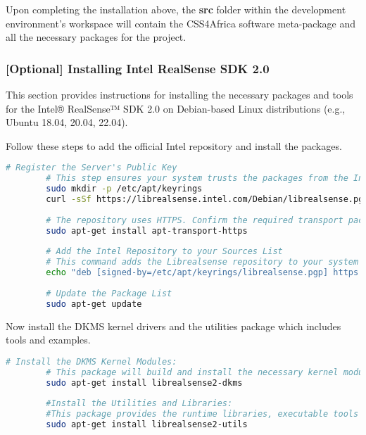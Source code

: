 \documentclass{CSSRforAfrica}
\begin{document}
{		\noindent Upon completing the installation above, the \textbf{src} folder within the development environment's workspace will contain the CSS4Africa software meta-package and all the necessary packages for the project. 
		
		\subsubsection{[Optional] Installing Intel RealSense SDK 2.0}
		This section provides instructions for installing the necessary packages and tools for the Intel® RealSense™ SDK 2.0 on Debian-based Linux distributions (e.g., Ubuntu 18.04, 20.04, 22.04).
		
		Follow these steps to add the official Intel repository and install the packages.
		
		\begin{lstlisting}[style=withoutNumbering, language=bash]
		# Register the Server's Public Key
		# This step ensures your system trusts the packages from the Intel repository.
		sudo mkdir -p /etc/apt/keyrings
		curl -sSf https://librealsense.intel.com/Debian/librealsense.pgp | sudo tee /etc/apt/keyrings/librealsense.pgp > /dev/null
		
		# The repository uses HTTPS. Confirm the required transport package is installed.
		sudo apt-get install apt-transport-https
		
		# Add the Intel Repository to your Sources List
		# This command adds the Librealsense repository to your system's list of software sources.
		echo "deb [signed-by=/etc/apt/keyrings/librealsense.pgp] https://librealsense.intel.com/Debian/apt-repo `lsb_release -cs` main" | sudo tee /etc/apt/sources.list.d/librealsense.list
		
		# Update the Package List
		sudo apt-get update
		\end{lstlisting}
		
		Now install the DKMS kernel drivers and the utilities package which includes tools and examples.
		
		\begin{lstlisting}[style=withoutNumbering, language=bash]
		# Install the DKMS Kernel Modules:
		# This package will build and install the necessary kernel modules for your system and deploy udev rules for device permissions.
		sudo apt-get install librealsense2-dkms
		
		#Install the Utilities and Libraries:
		#This package provides the runtime libraries, executable tools (e.g., realsense-viewer), and examples.
		sudo apt-get install librealsense2-utils
		\end{lstlisting}
		
}
\end{document}
